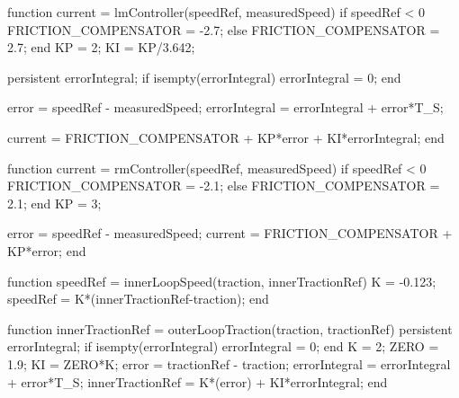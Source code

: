 \begin{matlabcode}

  function current = lmController(speedRef, measuredSpeed)
    if speedRef < 0
      FRICTION_COMPENSATOR  = -2.7;
    else
      FRICTION_COMPENSATOR  = 2.7;
    end
    KP = 2;
    KI = KP/3.642;

    persistent errorIntegral;
    if isempty(errorIntegral)
      errorIntegral = 0;
    end

    error = speedRef - measuredSpeed;
    errorIntegral = errorIntegral + error*T_S;

    current = FRICTION_COMPENSATOR + KP*error + KI*errorIntegral;
  end

  function current = rmController(speedRef, measuredSpeed)
    if speedRef < 0
      FRICTION_COMPENSATOR  = -2.1;
    else
      FRICTION_COMPENSATOR  = 2.1;
    end
    KP = 3;

    error = speedRef - measuredSpeed;
    current = FRICTION_COMPENSATOR + KP*error;
  end

  function speedRef = innerLoopSpeed(traction, innerTractionRef)
    K = -0.123;
    speedRef = K*(innerTractionRef-traction);
  end

  function innerTractionRef = outerLoopTraction(traction, tractionRef)
    persistent errorIntegral;
    if isempty(errorIntegral)
      errorIntegral = 0;
    end
    K = 2;
    ZERO = 1.9;
    KI = ZERO*K;
    error = tractionRef - traction;
    errorIntegral = errorIntegral + error*T_S;
    innerTractionRef = K*(error) + KI*errorIntegral;
  end

\end{matlabcode}
\clearpage
